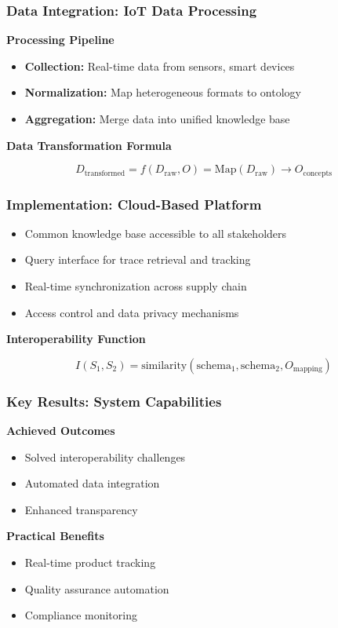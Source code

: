 \documentclass[11pt]{beamer}
\begin{document}
\begin{frame}
  \frametitle{Data Integration: IoT Data Processing}
  
  \textbf{Processing Pipeline}
  
  \begin{itemize}
    \item \textbf{Collection:} Real-time data from sensors, smart devices
    \item \textbf{Normalization:} Map heterogeneous formats to ontology
    \item \textbf{Aggregation:} Merge data into unified knowledge base
  \end{itemize}
  
  \vspace{0.5cm}
  \textbf{Data Transformation Formula}
  
  \[D_{\text{transformed}} = f(D_{\text{raw}}, O) = \text{Map}(D_{\text{raw}}) \rightarrow O_{\text{concepts}}\]
\end{frame}

\begin{frame}
  \frametitle{Implementation: Cloud-Based Platform}
  
  \begin{itemize}
    \item Common knowledge base accessible to all stakeholders
    \item Query interface for trace retrieval and tracking
    \item Real-time synchronization across supply chain
    \item Access control and data privacy mechanisms
  \end{itemize}
  
  \vspace{0.5cm}
  \textbf{Interoperability Function}
  
  \[I(S_1, S_2) = \text{similarity}(\text{schema}_1, \text{schema}_2, O_{\text{mapping}})\]
\end{frame}

\begin{frame}
  \frametitle{Key Results: System Capabilities}
  
  \textbf{Achieved Outcomes}
  \begin{itemize}
    \item Solved interoperability challenges
    \item Automated data integration
    \item Enhanced transparency
  \end{itemize}
  
  \vspace{0.5cm}
  
  \textbf{Practical Benefits}
  \begin{itemize}
    \item Real-time product tracking
    \item Quality assurance automation
    \item Compliance monitoring
  \end{itemize}
\end{frame}
\end{document}
